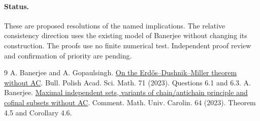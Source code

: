 \documentclass[11pt]{article}
\begin{document}
\paragraph{Status.} These are proposed resolutions of the named implications. The relative consistency direction uses the existing model of Banerjee without changing its construction. The proofs use no finite numerical test. Independent proof review and confirmation of priority are pending.
\begin{thebibliography}{9}
 A. Banerjee and A. Gopaulsingh. \href{https://doi.org/10.4064/ba221221-6-6}{On the Erdős--Dushnik--Miller theorem without AC}. Bull. Polish Acad. Sci. Math. 71 (2023). Questions 6.1 and 6.3.
 A. Banerjee. \href{https://dml.cz/handle/10338.dmlcz/151857}{Maximal independent sets, variants of chain/antichain principle and cofinal subsets without AC}. Comment. Math. Univ. Carolin. 64 (2023). Theorem 4.5 and Corollary 4.6.
\end{thebibliography}
\end{document}
